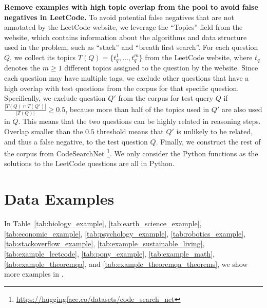\textbf{Remove examples with high topic overlap from the pool to avoid false negatives in LeetCode.} To avoid potential false negatives that are not annotated by the LeetCode website, we leverage the ``Topics'' field from the website, which contains information about the algorithms and data structure used in the problem, such as ``stack'' and ``breath first search''.
For each question $Q$, we collect its topics $T(Q) = \{t_q^1, \ldots, t_q^m\}$ from the LeetCode website, where $t_q$ denotes the $m \geq 1$ different topics assigned to the question by the website.
Since each question may have multiple tags, we exclude other questions that have a high overlap with test questions from the corpus for that specific question.
Specifically, we exclude question $Q'$ from the corpus for test query $Q$ if $\frac{|T(Q) \cap T({Q'})|}{|T(Q)|} \geq 0.5$, because more than half of the topics used in $Q'$ are also used in $Q$. 
This means that the two questions can be highly related in reasoning steps.
Overlap smaller than the $0.5$ threshold means that $Q'$ is unlikely to be related, and thus a false negative, to the test question $Q$. Finally, we construct the rest of the corpus from CodeSearchNet \citep{husain2019codesearchnet}\footnote{\url{https://huggingface.co/datasets/code_search_net}}.
We only consider the Python functions as the solutions to the LeetCode questions are all in Python.


\section{Data Examples}
\label{app:data_examples}
In Table~\ref{tab:biology_example}, \ref{tab:earth_science_example}, \ref{tab:economic_example}, \ref{tab:psychology_example}, \ref{tab:robotics_example}, \ref{tab:stackoverflow_example}, \ref{tab:example_sustainable_living}, \ref{tab:example_leetcode}, \ref{tab:pony_example}, \ref{tab:example_math}, \ref{tab:example_theoremqa}, and \ref{tab:example_theoremqa_theorems}, we show more examples in \ours.













